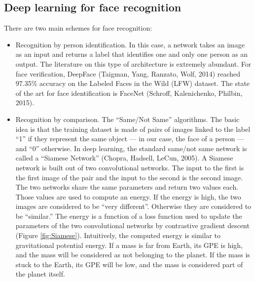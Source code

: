 \subsection{Deep learning for face recognition}
There are two main schemes for face recognition:
\begin{itemize}
\item Recognition by person identification. In this case, a network takes an image as an input and returns a label that identifies one and only one person as an output. The literature on this type of architecture is extremely abundant. For face verification, DeepFace (Taigman, Yang, Ranzato, Wolf, 2014) reached 97.35\% accuracy on the Labeled Faces in the Wild (LFW) dataset. The state of the art for face identification is FaceNet (Schroff, Kalenichenko, Philbin, 2015).

\item Recognition by comparison. The \enquote{Same/Not Same} algorithms. The basic idea is that the training dataset is made of pairs of images linked to the label \enquote{1} if they represent the same object --- in our case, the face of a person --- and \enquote{0} otherwise. In deep learning, the standard same/not same network is called a \enquote{Siamese Network} (Chopra, Hadsell, LeCun, 2005). A Siamese network is built out of two convolutional networks. The input to the first is the first image of the pair and the input to the second is the second image. The two networks share the same parameters and return two values each. Those values are used to compute an energy. If the energy is high, the two images are considered to be \enquote{very different}. Otherwise they are considered to be \enquote{similar.} The energy is a function of a loss function used to update the parameters of the two convolutional networks by contrastive gradient descent (Figure \ref{fig:Siamese}). Intuitively, the computed energy is similar to gravitational potential energy. If a mass is far from Earth, its GPE is high, and the mass will be considered as not belonging to the planet. If the mass is stuck to the Earth, its GPE will be low, and the mass is considered part of the planet itself.



\end{itemize}
